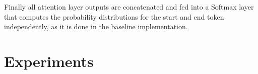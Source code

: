 \documentclass{article} %
\begin{document}
Finally all attention layer outputs are concatenated and fed into a Softmax layer that computes the probability distributions for the start and end token independently, as it is done in the baseline implementation.



\section{Experiments}
\end{document}
